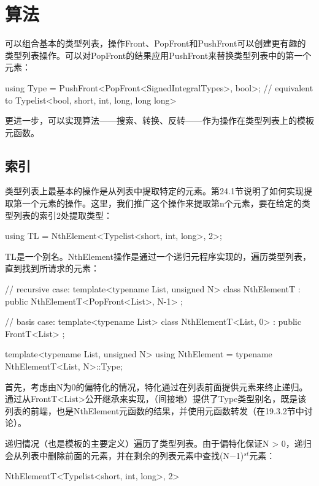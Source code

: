 \section{算法}

可以组合基本的类型列表，操作Front、PopFront和PushFront可以创建更有趣的类型列表操作。可以对PopFront的结果应用PushFront来替换类型列表中的第一个元素：

\begin{cpp}
using Type = PushFront<PopFront<SignedIntegralTypes>, bool>;
			// equivalent to Typelist<bool, short, int, long, long long>
\end{cpp}

更进一步，可以实现算法——搜索、转换、反转——作为操作在类型列表上的模板元函数。

\subsection{索引}

类型列表上最基本的操作是从列表中提取特定的元素。第24.1节说明了如何实现提取第一个元素的操作。这里，我们推广这个操作来提取第n个元素，要在给定的类型列表的索引2处提取类型：

\begin{cpp}
using TL = NthElement<Typelist<short, int, long>, 2>;
\end{cpp}

TL是一个别名。NthElement操作是通过一个递归元程序实现的，遍历类型列表，直到找到所请求的元素：

\begin{cpp}
// recursive case:
template<typename List, unsigned N>
class NthElementT : public NthElementT<PopFront<List>, N-1> {};

// basis case:
template<typename List>
class NthElementT<List, 0> : public FrontT<List> {};

template<typename List, unsigned N>
using NthElement = typename NthElementT<List, N>::Type;
\end{cpp}

首先，考虑由N为0的偏特化的情况，特化通过在列表前面提供元素来终止递归。通过从FrontT<List>公开继承来实现，（间接地）提供了Type类型别名，既是该列表的前端，也是NthElement元函数的结果，并使用元函数转发（在19.3.2节中讨论）。

递归情况（也是模板的主要定义）遍历了类型列表。由于偏特化保证N > 0，递归会从列表中删除前面的元素，并在剩余的列表元素中查找(N−1)$ ^{st} $元素：

\begin{cpp}
NthElementT<Typelist<short, int, long>, 2>
\end{cpp}

